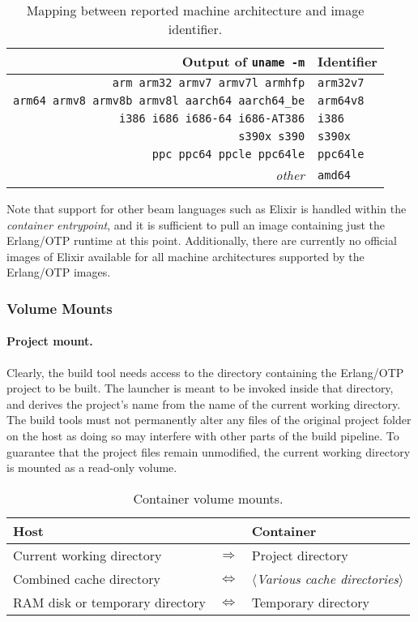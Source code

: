 \begin{table}
  \setlength{\tabcolsep}{10pt}
  \centering
  \begin{tabular}{ r l }
    Output of \lstinline|uname -m| & Identifier \\
    \hline
    \lstinline|arm arm32 armv7 armv7l armhfp| & \lstinline|arm32v7| \\
    \lstinline|arm64 armv8 armv8b armv8l aarch64 aarch64_be| & \lstinline|arm64v8| \\
    \lstinline|i386 i686 i686-64 i686-AT386| & \lstinline|i386| \\
    \lstinline|s390x s390| & \lstinline|s390x| \\
    \lstinline|ppc ppc64 ppcle ppc64le| & \lstinline|ppc64le| \\
    \emph{other} & \lstinline|amd64| \\
  \end{tabular}
  \caption{Mapping between reported machine architecture and image identifier.}\label{table:architectures}
\end{table}

Note that support for other \acrshort{beam} languages such as Elixir is handled within the \emph{container entrypoint}, and it is sufficient to pull an image containing just the Erlang/OTP runtime at this point. Additionally, there are currently no official images of Elixir available for all machine architectures supported by the Erlang/OTP images.

\subsubsection{Volume Mounts}

\paragraph{Project mount.} Clearly, the build tool needs access to the directory containing the Erlang/OTP project to be built. The launcher is meant to be invoked inside that directory, and derives the project's name from the name of the current working directory. The build tools must not permanently alter any files of the original project folder on the host as doing so may interfere with other parts of the build pipeline. To guarantee that the project files remain unmodified, the current working directory is mounted as a read-only volume.

\begin{table}[h]
  \setlength{\tabcolsep}{10pt}
  \centering
  \begin{tabular}{ l c l }
    Host & & Container \\
    \hline
    Current working directory &
      $\Longrightarrow$ &
      Project directory \\
    Combined cache directory &
      $\Longleftrightarrow$ &
      $\langle$\emph{Various cache directories}$\rangle$ \\
    RAM disk or temporary directory &
      $\Longleftrightarrow$ &
      Temporary directory \\
  \end{tabular}
  \caption{Container volume mounts.}
\end{table}

